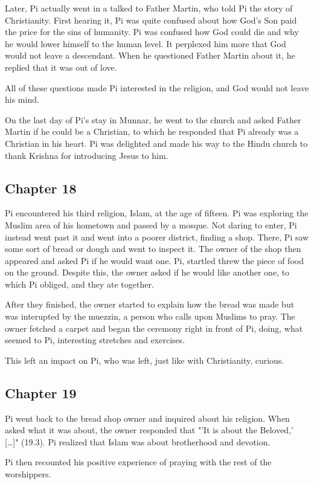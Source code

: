 \documentclass[11pt]{article}
\begin{document}
Later, Pi actually went in a talked to Father Martin, who told Pi the story of Christianity. First hearing it, Pi was quite confused about how God's Son paid the price for the sins of humanity. Pi was confused how God could die and why he would lower himself to the human level. It perplexed him more that God would not leave a descendant. When he questioned Father Martin about it, he replied that it was out of love.

All of these questions made Pi interested in the religion, and God would not leave his mind.

On the last day of Pi's stay in Munnar, he went to the church and asked Father Martin if he could be a Christian, to which he responded that Pi already was a Christian in his heart. Pi was delighted and made his way to the Hindu church to thank Krishna for introducing Jesus to him.
\subsection{Chapter 18}
\label{sec:org301fc95}
Pi encountered his third religion, Islam, at the age of fifteen. Pi was exploring the Muslim area of his hometown and passed by a mosque. Not daring to enter, Pi instead went past it and went into a poorer district, finding a shop. There, Pi saw some sort of bread or dough and went to inspect it. The owner of the shop then appeared and asked Pi if he would want one. Pi, startled threw the piece of food on the ground. Despite this, the owner asked if he would like another one, to which Pi obliged, and they ate together.

After they finished, the owner started to explain how the bread was made but was interupted by the muezzin, a person who calls upon Muslims to pray. The owner fetched a carpet and began the ceremony right in front of Pi, doing, what seemed to Pi, interesting stretches and exercises.

This left an impact on Pi, who was left, just like with Christianity, curious.
\subsection{Chapter 19}
\label{sec:orgbeada4e}
Pi went back to the bread shop owner and inquired about his religion. When asked what it was about, the owner responded that "'It is about the Beloved,' [\ldots{}]" (19.3). Pi realized that Islam was about brotherhood and devotion.

Pi then recounted his positive experience of praying with the rest of the worshippers.
\end{document}
